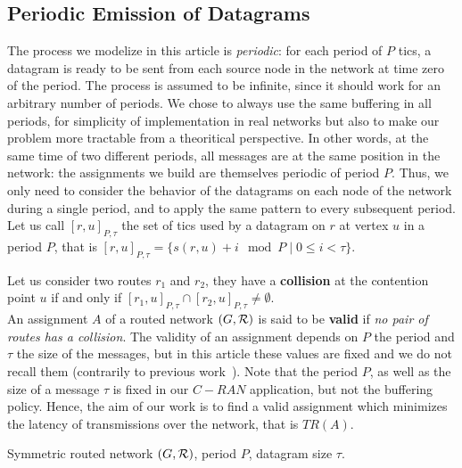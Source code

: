 \documentclass[english]{article}
\begin{document}
     
  \subsection{Periodic Emission of Datagrams}

 	The process we modelize in this article is \emph{periodic}: for each period of $P$ tics, a datagram is ready to be sent from each source node in the network at time zero of the period. The process is assumed to be infinite, since it should work for an arbitrary number of periods. We chose to always use the same buffering in all periods, for simplicity of implementation in real networks but also to make our problem more tractable from a theoritical perspective. In other words, at the same time of two different periods, all messages are at the same position in the network: the assignments we build are themselves periodic of period $P$. Thus, we only need to consider the behavior of the datagrams on each node of the network during a single period, and to apply the same pattern to every subsequent period. 
    Let us call $[r,u]_{P,\tau}$ the set of tics used by a datagram on $r$ at vertex $u$ in a period $P$, that is $[r,u]_{P,\tau} = \{s(r,u) + i \mod P \mid 0 \leq i < \tau \}$. 

      Let us consider two routes $r_1$ and $r_2$, they have a {\bf collision} at the contention point $u$ if and only if $[r_1,u]_{P,\tau} \cap [r_2,u]_{P,\tau} \neq \emptyset$.\\

        An assignment $A$ of a routed network $(G,{\cal R})$ is said to be \textbf{valid} if \emph{no pair of routes has a collision}. 
        The validity of an assignment depends on $P$ the period and $\tau$ the size of the messages, but in this article these values are fixed and we do not recall them (contrarily to previous work~\cite{Guir1806:Deterministic}).
        Note that the period $P$, as well as the size of a message $\tau$ is fixed in our $C-RAN$ application, but not the buffering policy. Hence, the aim of our work is to find a valid assignment which minimizes the latency of transmissions over the network, that is $TR(A)$.
       \\ 
       

        Symmetric routed network $(G,{\cal R})$, period $P$, datagram size $\tau$.%
      
\end{document}
